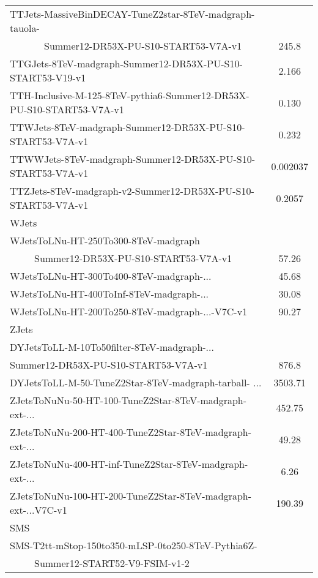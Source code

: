 \begin{table}[!htb]
\begin{center}
\begin{tabular}{|l|c|}
TTJets-MassiveBinDECAY-TuneZ2star-8TeV-madgraph-tauola- & \\
~~~~~~~Summer12-DR53X-PU-S10-START53-V7A-v1                & 245.8\\%
TTGJets-8TeV-madgraph-Summer12-DR53X-PU-S10-START53-V19-v1 & 2.166\\
TTH-Inclusive-M-125-8TeV-pythia6-Summer12-DR53X-PU-S10-START53-V7A-v1 &	0.130\\
TTWJets-8TeV-madgraph-Summer12-DR53X-PU-S10-START53-V7A-v1 & 0.232\\
TTWWJets-8TeV-madgraph-Summer12-DR53X-PU-S10-START53-V7A-v1 & 0.002037\\
TTZJets-8TeV-madgraph-v2-Summer12-DR53X-PU-S10-START53-V7A-v1 & 0.2057\\\hline

WJets& \\\hline

WJetsToLNu-HT-250To300-8TeV-madgraph &\\
~~~~~Summer12-DR53X-PU-S10-START53-V7A-v1                                    & 57.26 \\
WJetsToLNu-HT-300To400-8TeV-madgraph-...                                       & 45.68  \\
WJetsToLNu-HT-400ToInf-8TeV-madgraph-...                                       & 30.08 \\
WJetsToLNu-HT-200To250-8TeV-madgraph-...-V7C-v1                                & 90.27 \\\hline

ZJets & \\\hline
DYJetsToLL-M-10To50filter-8TeV-madgraph-... & \\
Summer12-DR53X-PU-S10-START53-V7A-v1             & 876.8\\
DYJetsToLL-M-50-TuneZ2Star-8TeV-madgraph-tarball-  ...              & 3503.71\\
ZJetsToNuNu-50-HT-100-TuneZ2Star-8TeV-madgraph-ext-...              & 452.75\\
ZJetsToNuNu-200-HT-400-TuneZ2Star-8TeV-madgraph-ext-...             & 49.28\\
ZJetsToNuNu-400-HT-inf-TuneZ2Star-8TeV-madgraph-ext-...             & 6.26\\
ZJetsToNuNu-100-HT-200-TuneZ2Star-8TeV-madgraph-ext-...V7C-v1          & 190.39\\\hline

SMS & \\\hline
SMS-T2tt-mStop-150to350-mLSP-0to250-8TeV-Pythia6Z- &\\
~~~~~Summer12-START52-V9-FSIM-v1-2 & \\


\end{tabular}
\end{center}
\end{table}
